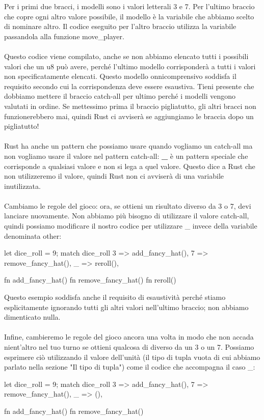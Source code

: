 \documentclass[11pt,a4paper]{article}
\begin{document}
Per i primi due bracci, i modelli sono i valori letterali 3 e 7. Per l'ultimo braccio che copre ogni altro valore possibile, il modello è la variabile che abbiamo scelto di nominare altro. Il codice eseguito per l'altro braccio utilizza la variabile passandola alla funzione move\_player.\\
\\
Questo codice viene compilato, anche se non abbiamo elencato tutti i possibili valori che un u8 può avere, perché l'ultimo modello corrisponderà a tutti i valori non specificatamente elencati. Questo modello onnicomprensivo soddisfa il requisito secondo cui la corrispondenza deve essere esaustiva. Tieni presente che dobbiamo mettere il braccio catch-all per ultimo perché i modelli vengono valutati in ordine. Se mettessimo prima il braccio pigliatutto, gli altri bracci non funzionerebbero mai, quindi Rust ci avviserà se aggiungiamo le braccia dopo un pigliatutto!\\
\\
Rust ha anche un pattern che possiamo usare quando vogliamo un catch-all ma non vogliamo usare il valore nel pattern catch-all: \textbf{\_} è un pattern speciale che corrisponde a qualsiasi valore e non si lega a quel valore. Questo dice a Rust che non utilizzeremo il valore, quindi Rust non ci avviserà di una variabile inutilizzata.\\
\\
Cambiamo le regole del gioco: ora, se ottieni un risultato diverso da 3 o 7, devi lanciare nuovamente. Non abbiamo più bisogno di utilizzare il valore catch-all, quindi possiamo modificare il nostro codice per utilizzare \_ invece della variabile denominata other:

\begin{rust}
    let dice_roll = 9;
    match dice_roll {
        3 => add_fancy_hat(),
        7 => remove_fancy_hat(),
        _ => reroll(),
    }

    fn add_fancy_hat() {}
    fn remove_fancy_hat() {}
    fn reroll() {}
\end{rust}
Questo esempio soddisfa anche il requisito di esaustività perché stiamo esplicitamente ignorando tutti gli altri valori nell'ultimo braccio; non abbiamo dimenticato nulla.\\
\\
Infine, cambieremo le regole del gioco ancora una volta in modo che non accada nient'altro nel tuo turno se ottieni qualcosa di diverso da un 3 o un 7. Possiamo esprimere ciò utilizzando il valore dell'unità (il tipo di tupla vuota di cui abbiamo parlato nella sezione "Il tipo di tupla") come il codice che accompagna il caso \_:
\begin{rust}
    let dice_roll = 9;
    match dice_roll {
        3 => add_fancy_hat(),
        7 => remove_fancy_hat(),
        _ => (),
    }

    fn add_fancy_hat() {}
    fn remove_fancy_hat() {}
\end{rust}
\end{document}
